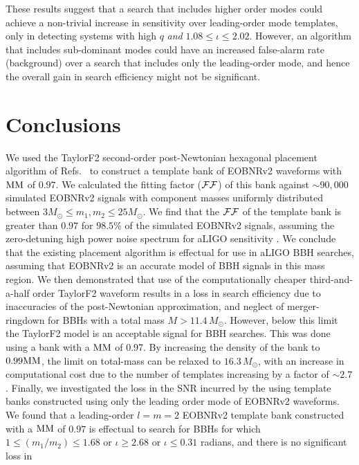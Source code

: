 These results suggest that a search that includes higher order modes
could achieve a non-trivial increase in sensitivity over leading-order mode
templates, only in detecting systems with high $q$ \textit{and} $1.08\leq\iota\leq 2.02$.  
However, an algorithm that includes sub-dominant modes could have an 
increased false-alarm rate (background) over a search that includes 
only the leading-order mode, and hence the overall gain in search efficiency
might not be significant. 

\section{Conclusions}
\label{s:conclusions}

We used the TaylorF2 second-order post-Newtonian hexagonal placement algorithm
of Refs.~\cite{SathyaMetric2PN,BabaketalBankPlacement,Cokelaer:2007kx} to construct a
template bank of EOBNRv2 waveforms with $\mathrm{MM}$ of $0.97$. We calculated the
fitting factor ($\mathcal{FF}$) of this bank against $\sim 90,000$ simulated EOBNRv2
signals with component masses uniformly distributed between $3 M_{\odot} \le
m_1,m_2 \le 25 M_{\odot}$. We find that the $\mathcal{FF}$ of the template bank is
greater than $0.97$ for $98.5\%$ of the simulated EOBNRv2 signals, assuming
the zero-detuning high power noise spectrum for aLIGO sensitivity
\cite{aLIGONoiseCurve}. We conclude that the existing placement algorithm is
effectual for use in aLIGO BBH searches, assuming that EOBNRv2 is an accurate
model of BBH signals in this mass region.  We then demonstrated that use of the
computationally cheaper third-and-a-half order TaylorF2 waveform results in a
loss in search efficiency due to inaccuracies of the post-Newtonian
approximation, and neglect of merger-ringdown for BBHs with a total mass $M >
11.4\,M_{\odot}$. However, below this limit the TaylorF2 model is an acceptable
signal for BBH searches. This was done using a bank with a $\mathrm{MM}$ of 0.97. By 
increasing the density of the bank to $0.99\mathrm{MM}$, the limit on total-mass can be 
relaxed to $16.3\,M_{\odot}$, with an increase in computational cost due to the 
number of templates increasing by a factor of $\sim 2.7$. Finally, we investigated 
the loss in the SNR incurred by the using template banks constructed using 
only the leading order mode of EOBNRv2 waveforms.  We found that a leading-order 
$l=m=2$ EOBNRv2 template bank constructed with a $\mathrm{MM}$ of $0.97$ is effectual 
to search for BBHs for which $1\leq \left(m_1/m_2\right)\leq 1.68$ or $\iota \geq 2.68$ 
or $\iota\leq 0.31$ radians, and there is no significant loss in
